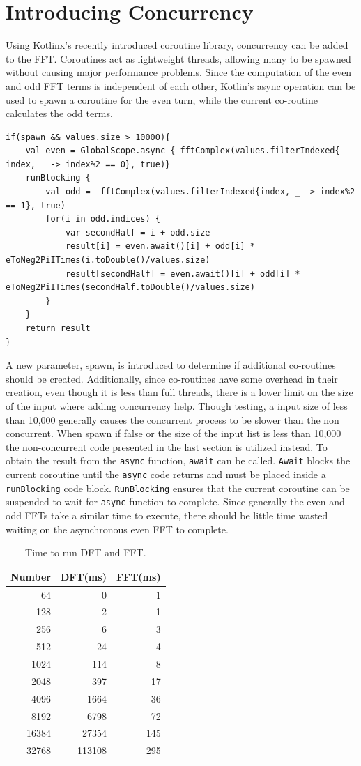 \documentclass[sigconf]{acmart}
\begin{document}
\section{Introducing Concurrency}
Using Kotlinx's recently introduced coroutine library, concurrency can be added to the FFT. Coroutines act as lightweight threads, allowing many to be spawned without causing major performance problems. Since the computation of the even and odd FFT terms is independent of each other, Kotlin's async operation can be used to spawn a coroutine for the even turn, while the current co-routine calculates the odd terms.
\begin{lstlisting}
if(spawn && values.size > 10000){
    val even = GlobalScope.async { fftComplex(values.filterIndexed{ index, _ -> index%2 == 0}, true)}
    runBlocking {
        val odd =  fftComplex(values.filterIndexed{index, _ -> index%2 == 1}, true)
        for(i in odd.indices) {
            var secondHalf = i + odd.size
            result[i] = even.await()[i] + odd[i] * eToNeg2PiITimes(i.toDouble()/values.size)
            result[secondHalf] = even.await()[i] + odd[i] * eToNeg2PiITimes(secondHalf.toDouble()/values.size)
        }
    }
    return result
}
\end{lstlisting}
A new parameter, spawn, is introduced to determine if additional co-routines should be created. Additionally, since co-routines have some overhead in their creation, even though it is less than full threads, there is a lower limit on the size of the input where adding concurrency help. Though testing, a input size of less than 10,000 generally causes the concurrent process to be slower than the non concurrent. When spawn if false or the size of the input list is less than 10,000 the non-concurrent code presented in the last section is utilized instead.
To obtain the result from the \texttt{async} function, \texttt{await} can be called. \texttt{Await} blocks the current coroutine until the \texttt{async} code returns and must be placed inside a \texttt{runBlocking} code block. \texttt{RunBlocking} ensures that the current coroutine can be suspended to wait for \texttt{async} function to complete. Since generally the even and odd FFTs take a similar time to execute, there should be little time wasted waiting on the asynchronous even FFT to complete.
\begin{table}
  \caption{Time to run DFT and FFT.}
  \label{tab:dtf}
  \begin{tabular}{rrr}
    \toprule
    Number & DFT(ms) & FFT(ms)\\
    \midrule
    64 &  0 & 1\\
    128 &  2 & 1\\
    256 &  6 & 3\\
    512 &  24 & 4\\
    1024 &  114 & 8\\
    2048 &  397 & 17\\
    4096 &  1664 & 36\\
    8192 &  6798 & 72\\
    16384 &  27354 & 145\\
    32768 &  113108 & 295\\
  \bottomrule
\end{tabular}
\end{table}
\end{document}
